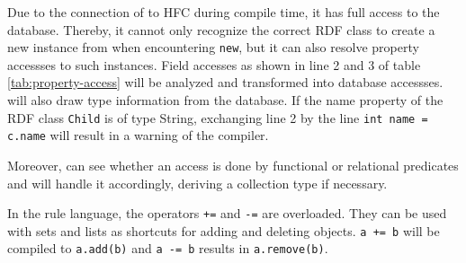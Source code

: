 %
Due to the connection of \vonda to HFC during compile time, it has full access to the database. Thereby, it cannot only recognize the correct RDF class to create a new instance from when encountering \texttt{new}, but it can also resolve property accessses to such instances. Field accesses as shown in line 2 and 3 of table \ref{tab:property-access} will be analyzed and transformed into database accessses. \vonda will also draw type information from the database. If the name property of the RDF class \texttt{Child} is of type String, exchanging line 2 by the line \texttt{int name = c.name} will result in a warning of the compiler.

%
Moreover, \vonda can see whether an access is done by functional or relational predicates and will handle it accordingly, deriving a collection type if necessary.


In the rule language, the operators \texttt{+=} and \texttt{-=} are overloaded. They can be used with sets and lists as shortcuts for adding and deleting objects. \texttt{a += b} will be compiled to \texttt{a.add(b)} and \texttt{a -= b} results in \texttt{a.remove(b)}.

